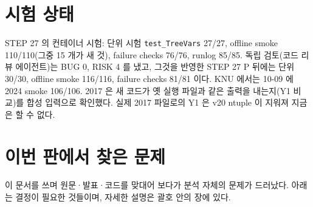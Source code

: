 \section{시험 상태}\label{sec:status-tests}

STEP 27 의 컨테이너 시험: 단위 시험 \texttt{test\_TreeVars} 27/27, offline smoke 110/110(그중 15 개가 새 것), failure checks 76/76,
runlog 85/85. 독립 검토(코드 리뷰 에이전트)는 BUG 0, RISK 4 를 냈고, 그것을 반영한 STEP 27 P 뒤에는 단위 30/30,
offline smoke 116/116, failure checks 81/81 이다. KNU 에서는 10-09 에 2024 smoke 106/106. 2017 은 새 코드가 옛 실행 파일과
같은 출력을 내는지(Y1 비교)를 합성 입력으로 확인했다. 실제 2017 파일로의 Y1 은 v20 ntuple 이 지워져 지금은 할 수 없다.

\section{이번 판에서 찾은 문제}\label{sec:status-findings}

이 문서를 쓰며 원문·발표·코드를 맞대어 보다가 분석 자체의 문제가 드러났다. 아래는 결정이 필요한 것들이며, 자세한 설명은 괄호 안의 장에 있다.

